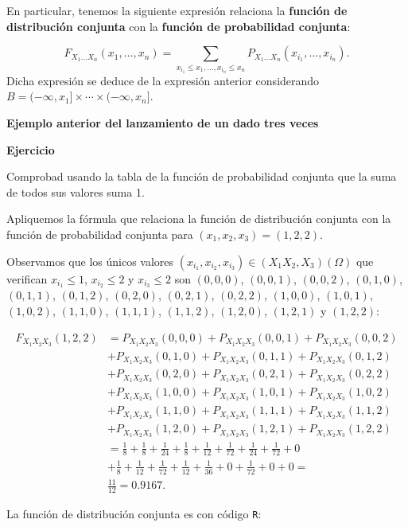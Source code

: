 \documentclass[]{book}
\begin{document}
En particular, tenemos la siguiente expresión relaciona la \textbf{función de distribución conjunta} con la \textbf{función de probabilidad conjunta}:

\[
F_{X_1\ldots X_n}(x_1,\ldots,x_n)=\sum_{x_{i_1}\leq x_1,\ldots, x_{i_n}\leq x_n} P_{X_1\ldots X_n}(x_{i_1},\ldots,x_{i_n}).
\]
Dicha expresión se deduce de la expresión anterior considerando \(B=(-\infty,x_1]\times\cdots\times (-\infty,x_n]\).

\textbf{Ejemplo anterior del lanzamiento de un dado tres veces}

\textbf{Ejercicio}

Comprobad usando la tabla de la función de probabilidad conjunta que la suma de todos sus valores suma 1.

Apliquemos la fórmula que relaciona la función de distribución conjunta con la función de probabilidad conjunta para \((x_1,x_2,x_3)=(1,2,2)\).

Observamos que los únicos valores \((x_{i_1},x_{i_2},x_{i_3})\in (X_1 X_2,X_3)(\Omega)\) que verifican \(x_{i_1}\leq 1\), \(x_{i_2}\leq 2\) y \(x_{i_3}\leq 2\) son \((0,0,0)\), \((0,0,1)\), \((0,0,2)\), \((0,1,0)\), \((0,1,1)\), \((0,1,2)\), \((0,2,0)\), \((0,2,1)\), \((0,2,2)\), \((1,0,0)\), \((1,0,1)\), \((1,0,2)\), \((1,1,0)\), \((1,1,1)\), \((1,1,2)\), \((1,2,0)\), \((1,2,1)\) y \((1,2,2)\):

\[
\begin{array}{rl}
F_{X_1X_2X_3}(1,2,2) 
& =P_{X_1X_2X_3}(0,0,0)+P_{X_1X_2X_3}(0,0,1)+P_{X_1X_2X_3}(0,0,2)\\
& +P_{X_1X_2X_3}(0,1,0)+P_{X_1X_2X_3}(0,1,1)+P_{X_1X_2X_3}(0,1,2)\\
& +P_{X_1X_2X_3}(0,2,0)+P_{X_1X_2X_3}(0,2,1)+P_{X_1X_2X_3}(0,2,2)\\
& +P_{X_1X_2X_3}(1,0,0)+P_{X_1X_2X_3}(1,0,1)+P_{X_1X_2X_3}(1,0,2)\\ 
& +P_{X_1X_2X_3}(1,1,0)+P_{X_1X_2X_3}(1,1,1)+P_{X_1X_2X_3}(1,1,2)\\
& +P_{X_1X_2X_3}(1,2,0)+ P_{X_1X_2X_3}(1,2,1)+P_{X_1X_2X_3}(1,2,2)\\ 
&=\frac{1}{8}+\frac{1}{8}+\frac{1}{24}+\frac{1}{8}+\frac{1}{12}+\frac{1}{72}+\frac{1}{24}+\frac{1}{72}+0\\
& +\frac{1}{8}+\frac{1}{12}+\frac{1}{72}+\frac{1}{12}+\frac{1}{36} +0+\frac{1}{72}+0+0=\\
& \frac{11}{12}=0.9167.
\end{array}
\]

La función de distribución conjunta es con código \texttt{R}:
\end{document}
